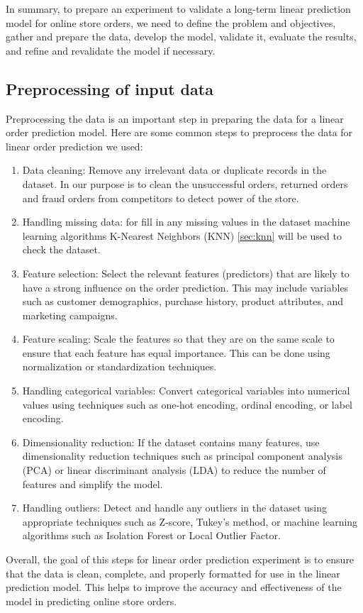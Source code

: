 In summary, to prepare an experiment to validate a long-term linear prediction model for online store orders, we need to
define the problem and objectives, gather and prepare the data, develop the model, validate it, evaluate the results,
and refine and revalidate the model if necessary.
    \subsection{Preprocessing of input data} \label{subsec:preprocessing}
    Preprocessing the data is an important step in preparing the data for a linear order prediction model.
    Here are some common steps to preprocess the data for linear order prediction we used:

    \begin{enumerate}
        \item Data cleaning: Remove any irrelevant data or duplicate records in the dataset. In our purpose is to
        clean the unsuccessful orders, returned orders and fraud orders from competitors to detect power of the store.
        \item Handling missing data: for fill in any missing values in the dataset machine learning algorithms
        K-Nearest Neighbors (KNN) \ref{sec:knn} will be used to check the dataset.
        \item Feature selection: Select the relevant features (predictors) that are likely to have a strong
        influence on the order prediction. This may include variables such as customer demographics, purchase
        history, product attributes, and marketing campaigns.
        \item Feature scaling: Scale the features so that they are on the same scale to ensure that each feature
        has equal importance. This can be done using normalization or standardization techniques.
        \item Handling categorical variables: Convert categorical variables into numerical values using techniques
        such as one-hot encoding, ordinal encoding, or label encoding.
        \item Dimensionality reduction: If the dataset contains many features, use dimensionality reduction techniques
        such as principal component analysis (PCA) or linear discriminant analysis (LDA) to reduce the
        number of features and simplify the model.
        \item Handling outliers: Detect and handle any outliers in the dataset using appropriate techniques
        such as Z-score, Tukey’s method, or machine learning algorithms such as Isolation Forest or Local Outlier Factor.
    \end{enumerate}
    Overall, the goal of this steps for linear order prediction experiment is to ensure that the data is clean,
    complete, and properly formatted for use in the linear prediction model. This helps to improve the
    accuracy and effectiveness of the model in predicting online store orders.
